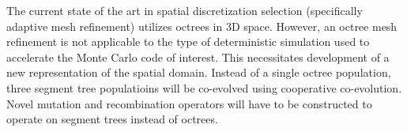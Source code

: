 \documentclass{article}
\begin{document}
The current state of the art in spatial discretization selection (specifically adaptive mesh refinement) utilizes octrees in 3D space. However, an octree mesh refinement is not applicable to the type of deterministic simulation used to accelerate the Monte Carlo code of interest. This necessitates development of a new representation of the spatial domain. Instead of a single octree population, three segment tree populatioins will be co-evolved using cooperative co-evolution. Novel mutation and recombination operators will have to be constructed to operate on segment trees instead of octrees.
 
\end{document}
